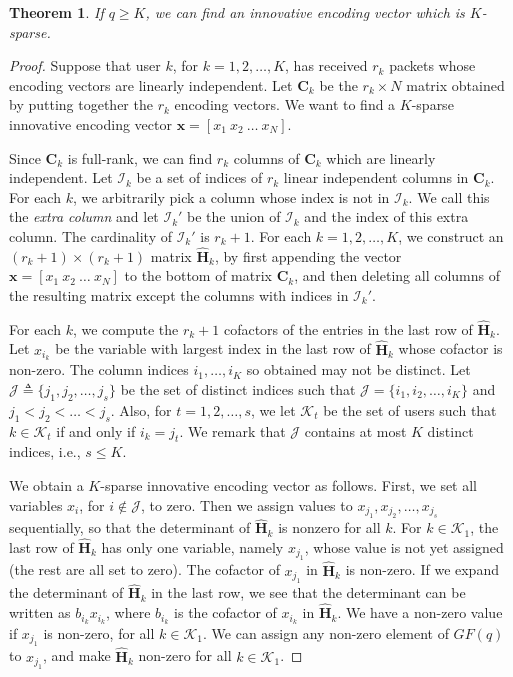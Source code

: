 \documentclass[letterpaper,conference,10pt]{IEEEtran}
\newtheorem{theorem}{Theorem}
\begin{document}
\begin{theorem}
If $q \geq K$, we can find an innovative encoding vector which is $K$-sparse. \label{thm:cofactor}
\end{theorem}

\begin{proof}
Suppose that user $k$, for $k=1,2,\ldots, K$, has received $r_k$ packets whose encoding vectors are linearly independent.
Let $\mathbf{C}_k$ be the $r_k \times N$ matrix obtained by putting together the $r_k$ encoding vectors. We want to find a $K$-sparse innovative encoding vector $\mathbf{x} = [x_1\ x_2\ \ldots \ x_N]$.

Since $\mathbf{C}_k$ is full-rank, we can find $r_k$ columns of $\mathbf{C}_k$ which are linearly independent. Let $\mathcal{I}_k$ be a set of indices of $r_k$ linear independent columns in $\mathbf{C}_k$. For each $k$, we arbitrarily pick a column whose index is not in $\mathcal{I}_k$.  We call this the {\em extra column} and let $\mathcal{I}_k'$ be the union of $\mathcal{I}_k$ and the index of this extra column. The cardinality of $\mathcal{I}_k'$ is $r_k+1$. For each $k=1,2,\ldots, K$, we construct an $(r_k+1) \times (r_k+1)$ matrix $\hat{\mathbf{H}}_k$, by first appending the vector $\mathbf{x} = [x_1 \ x_2 \ \ldots \ x_N]$ to the bottom of matrix $\mathbf{C}_k$, and then deleting all columns of the resulting matrix except the columns with indices in $\mathcal{I}_k'$.

For each $k$, we compute the $r_k+1$ cofactors of the entries in the last row of $\hat{\mathbf{H}}_k$. Let $x_{i_k}$ be the variable with largest index in the last row of $\hat{\mathbf{H}}_k$ whose cofactor is non-zero. The column indices $i_1,\ldots, i_K$ so obtained may not be distinct. Let $\mathcal{J} \triangleq \{j_1,j_2,\ldots, j_s\}$ be the set of distinct indices such that $\mathcal{J} = \{i_1,i_2,\ldots, i_K\}$ and $j_1 < j_2 < \ldots< j_s$. Also, for $t=1,2,\ldots, s$, we let $\mathcal{K}_t$ be the set of users such that $k\in\mathcal{K}_t$ if and only if $i_k = j_t$.
We remark that $\mathcal{J}$ contains at most $K$ distinct indices, i.e., $s\leq K$.

We obtain a $K$-sparse innovative encoding vector as follows. First, we set all variables $x_i$, for $i\notin \mathcal{J}$, to zero. Then we assign values to $x_{j_1}, x_{j_2}, \ldots, x_{j_s}$ sequentially, so that the determinant of $\hat{\mathbf{H}}_k$ is nonzero for all $k$. For $k \in \mathcal{K}_1$, the last row of $\hat{\mathbf{H}}_k$ has only one variable, namely $x_{j_1}$, whose value is not yet assigned (the rest are all set to zero). The cofactor of $x_{j_1}$ in $\hat{\mathbf{H}}_k$ is non-zero. If we expand the determinant of $\hat{\mathbf{H}}_k$ in the last row, we see that the determinant can be written as $b_{i_k} x_{i_k}$, where $b_{i_k}$ is the cofactor of $x_{i_k}$ in  $\hat{\mathbf{H}}_k$. We have a non-zero value if $x_{j_1}$ is non-zero, for all  $k \in \mathcal{K}_1$. We can assign any non-zero element of $GF(q)$ to $x_{j_1}$, and make $\hat{\mathbf{H}}_k$ non-zero for all $k\in\mathcal{K}_1$.


\end{proof}
\end{document}
